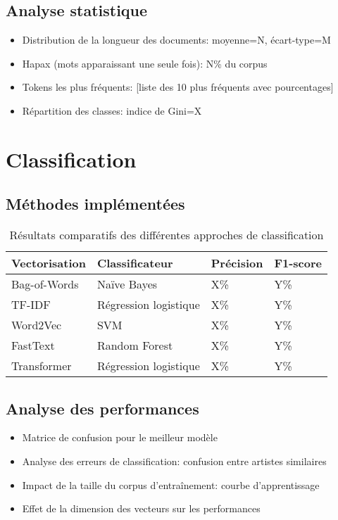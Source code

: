 \documentclass[a4paper,11pt]{article}
\begin{document}
\subsection{Analyse statistique}
\begin{itemize}
    \item Distribution de la longueur des documents: moyenne=N, écart-type=M
    \item Hapax (mots apparaissant une seule fois): N\% du corpus
    \item Tokens les plus fréquents: [liste des 10 plus fréquents avec pourcentages]
    \item Répartition des classes: indice de Gini=X
\end{itemize}

\section{Classification}
\label{sec:classification}

\subsection{Méthodes implémentées}
\begin{table}[h]
\centering
\begin{tabular}{llll}
\toprule
\textbf{Vectorisation} & \textbf{Classificateur} & \textbf{Précision} & \textbf{F1-score} \\
\midrule
Bag-of-Words & Naïve Bayes & X\% & Y\% \\
TF-IDF & Régression logistique & X\% & Y\% \\
Word2Vec & SVM & X\% & Y\% \\
FastText & Random Forest & X\% & Y\% \\
Transformer & Régression logistique & X\% & Y\% \\
\bottomrule
\end{tabular}
\caption{Résultats comparatifs des différentes approches de classification}
\label{tab:classification-results}
\end{table}

\subsection{Analyse des performances}
\begin{itemize}
    \item Matrice de confusion pour le meilleur modèle
    \item Analyse des erreurs de classification: confusion entre artistes similaires
    \item Impact de la taille du corpus d'entraînement: courbe d'apprentissage
    \item Effet de la dimension des vecteurs sur les performances
\end{itemize}
\end{document}
